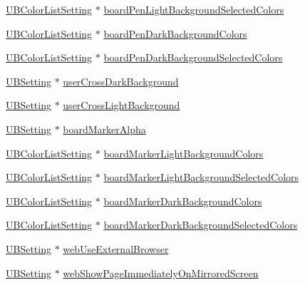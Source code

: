 \begin{DoxyCompactItemize}
\item 
\hyperlink{class_u_b_color_list_setting}{U\-B\-Color\-List\-Setting} $\ast$ \hyperlink{class_u_b_settings_a7875b1ae8bfd70fa0a0f695eb5e8b8f9}{board\-Pen\-Light\-Background\-Selected\-Colors}
\item 
\hyperlink{class_u_b_color_list_setting}{U\-B\-Color\-List\-Setting} $\ast$ \hyperlink{class_u_b_settings_a3930fcf1b8ca3202ac6c38fcb0d02b16}{board\-Pen\-Dark\-Background\-Colors}
\item 
\hyperlink{class_u_b_color_list_setting}{U\-B\-Color\-List\-Setting} $\ast$ \hyperlink{class_u_b_settings_afbce5811f6a1971349a19050393d7471}{board\-Pen\-Dark\-Background\-Selected\-Colors}
\item 
\hyperlink{class_u_b_setting}{U\-B\-Setting} $\ast$ \hyperlink{class_u_b_settings_a05a319676b2f30edc2aef2f80d2b2d37}{user\-Cross\-Dark\-Background}
\item 
\hyperlink{class_u_b_setting}{U\-B\-Setting} $\ast$ \hyperlink{class_u_b_settings_abb0809c7edab4cf15754a6d185f1fd06}{user\-Cross\-Light\-Background}
\item 
\hyperlink{class_u_b_setting}{U\-B\-Setting} $\ast$ \hyperlink{class_u_b_settings_a3c96cf37dc85d70412b7bd64658686da}{board\-Marker\-Alpha}
\item 
\hyperlink{class_u_b_color_list_setting}{U\-B\-Color\-List\-Setting} $\ast$ \hyperlink{class_u_b_settings_ade781b9fcdd9c51423729bdac51cf242}{board\-Marker\-Light\-Background\-Colors}
\item 
\hyperlink{class_u_b_color_list_setting}{U\-B\-Color\-List\-Setting} $\ast$ \hyperlink{class_u_b_settings_ae049f91718c90652014484c99064a452}{board\-Marker\-Light\-Background\-Selected\-Colors}
\item 
\hyperlink{class_u_b_color_list_setting}{U\-B\-Color\-List\-Setting} $\ast$ \hyperlink{class_u_b_settings_abe1fa4363f893e592ec213551fb70086}{board\-Marker\-Dark\-Background\-Colors}
\item 
\hyperlink{class_u_b_color_list_setting}{U\-B\-Color\-List\-Setting} $\ast$ \hyperlink{class_u_b_settings_a4b7af9f01a8c26c2089451a7f472fb60}{board\-Marker\-Dark\-Background\-Selected\-Colors}
\item 
\hyperlink{class_u_b_setting}{U\-B\-Setting} $\ast$ \hyperlink{class_u_b_settings_adb8d7a0850fe577904e805075e4c3d19}{web\-Use\-External\-Browser}
\item 
\hyperlink{class_u_b_setting}{U\-B\-Setting} $\ast$ \hyperlink{class_u_b_settings_a05cdb824b75f8ef7d150524e23d4bcf7}{web\-Show\-Page\-Immediately\-On\-Mirrored\-Screen}

\end{DoxyCompactItemize}
